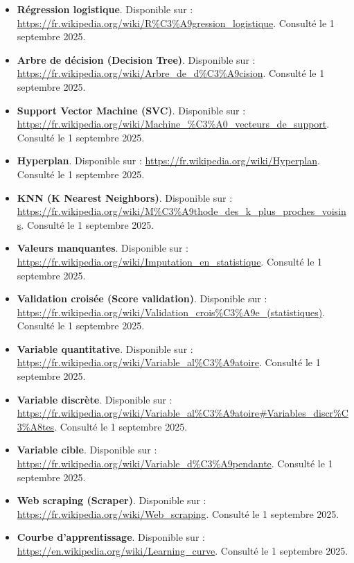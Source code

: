 \begin{itemize}
	\item \textbf{Régression logistique}. Disponible sur : \url{https://fr.wikipedia.org/wiki/R%C3%A9gression_logistique}. Consulté le 1 septembre 2025.
	
	\item \textbf{Arbre de décision (Decision Tree)}. Disponible sur : \url{https://fr.wikipedia.org/wiki/Arbre_de_d%C3%A9cision}. Consulté le 1 septembre 2025.
	
	\item \textbf{Support Vector Machine (SVC)}. Disponible sur : \url{https://fr.wikipedia.org/wiki/Machine_%C3%A0_vecteurs_de_support}. Consulté le 1 septembre 2025.
	
	\item \textbf{Hyperplan}. Disponible sur : \url{https://fr.wikipedia.org/wiki/Hyperplan}. Consulté le 1 septembre 2025.
	
	\item \textbf{KNN (K Nearest Neighbors)}. Disponible sur : \url{https://fr.wikipedia.org/wiki/M%C3%A9thode_des_k_plus_proches_voisins}. Consulté le 1 septembre 2025.

	\item \textbf{Valeurs manquantes}. Disponible sur : \url{https://fr.wikipedia.org/wiki/Imputation_en_statistique}. Consulté le 1 septembre 2025.
	
	\item \textbf{Validation croisée (Score validation)}. Disponible sur : \url{https://fr.wikipedia.org/wiki/Validation_crois%C3%A9e_(statistiques)}. Consulté le 1 septembre 2025.
	
	\item \textbf{Variable quantitative}. Disponible sur : \url{https://fr.wikipedia.org/wiki/Variable_al%C3%A9atoire}. Consulté le 1 septembre 2025.
	
	\item \textbf{Variable discrète}. Disponible sur : \url{https://fr.wikipedia.org/wiki/Variable_al%C3%A9atoire#Variables_discr%C3%A8tes}. Consulté le 1 septembre 2025.
	
	\item \textbf{Variable cible}. Disponible sur : \url{https://fr.wikipedia.org/wiki/Variable_d%C3%A9pendante}. Consulté le 1 septembre 2025.
	
	
	\item \textbf{Web scraping (Scraper)}. Disponible sur : \url{https://fr.wikipedia.org/wiki/Web_scraping}. Consulté le 1 septembre 2025.
	
	\item \textbf{Courbe d’apprentissage}. Disponible sur : \url{https://en.wikipedia.org/wiki/Learning_curve}. Consulté le 1 septembre 2025.
	

\end{itemize}
